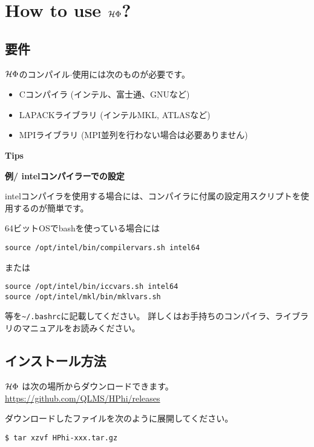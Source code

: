 \chapter{How to use $\mathcal{H} \Phi$?}
\label{Ch:HowTo}

\section{要件}

$\mathcal{H} \Phi$のコンパイル$\cdot$使用には次のものが必要です。
\begin{itemize}
\item Cコンパイラ (インテル、富士通、GNUなど)
\item LAPACKライブラリ (インテルMKL, ATLASなど)
\item MPIライブラリ (MPI並列を行わない場合は必要ありません)
\end{itemize}

\begin{screen}
\Large 
{\bf Tips}
\normalsize

{\bf 例/ intelコンパイラーでの設定}

intelコンパイラを使用する場合には、コンパイラに付属の設定用スクリプトを使用するのが簡単です。

64ビットOSでbashを使っている場合には
\begin{verbatim}
source /opt/intel/bin/compilervars.sh intel64
\end{verbatim}
または
\begin{verbatim}
source /opt/intel/bin/iccvars.sh intel64
source /opt/intel/mkl/bin/mklvars.sh
\end{verbatim}
等を\verb|~/.bashrc|に記載してください。
詳しくはお手持ちのコンパイラ、ライブラリのマニュアルをお読みください。

\end{screen}


\section{インストール方法}

$\mathcal{H} \Phi$ は次の場所からダウンロードできます。\\
\url{https://github.com/QLMS/HPhi/releases}

ダウンロードしたファイルを次のように展開してください。
\begin{verbatim}
$ tar xzvf HPhi-xxx.tar.gz
\end{verbatim}

